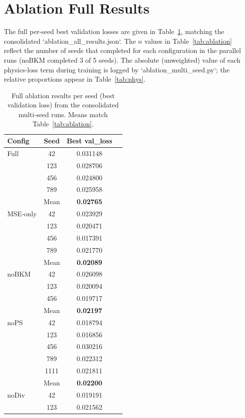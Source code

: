 \documentclass[review]{elsarticle}
\begin{document}
\appendix
\section{Ablation Full Results}
\label{app:ablation}

The full per-seed best validation losses are given in Table~\ref{tab:ablation-full}, matching the
consolidated `ablation\_all\_results.json`. The $n$ values in Table~\ref{tab:ablation} reflect the
number of seeds that completed for each configuration in the parallel runs (noBKM completed 3 of
5 seeds). The absolute (unweighted) value of each physics-loss term during training is logged by
`ablation\_multi\_seed.py`; the relative proportions appear in Table~\ref{tab:phys}.

\begin{table}[h]
\centering
\caption{Full ablation results per seed (best validation loss) from the consolidated multi-seed runs. Means match Table~\ref{tab:ablation}.}
\label{tab:ablation-full}
\begin{tabular}{lccc}
\toprule
Config & Seed & Best val\_loss \\
\midrule
Full & 42 & 0.031148 \\
& 123 & 0.028706 \\
& 456 & 0.024800 \\
& 789 & 0.025958 \\
& Mean & \textbf{0.02765} \\
\midrule
MSE-only & 42 & 0.023929 \\
& 123 & 0.020471 \\
& 456 & 0.017391 \\
& 789 & 0.021770 \\
& Mean & \textbf{0.02089} \\
\midrule
noBKM & 42 & 0.026098 \\
& 123 & 0.020094 \\
& 456 & 0.019717 \\
& Mean & \textbf{0.02197} \\
\midrule
noPS & 42 & 0.018794 \\
& 123 & 0.016856 \\
& 456 & 0.030216 \\
& 789 & 0.022312 \\
& 1111 & 0.021811 \\
& Mean & \textbf{0.02200} \\
\midrule
noDiv & 42 & 0.019191 \\
& 123 & 0.021562 \\

\end{tabular}
\end{table}
\end{document}
